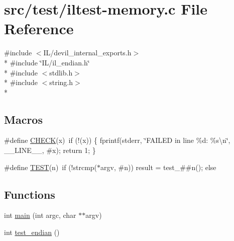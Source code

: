 \hypertarget{iltest-memory_8c}{\section{src/test/iltest-\/memory.c File Reference}
\label{iltest-memory_8c}
}
{\ttfamily \#include $<$I\-L/devil\-\_\-internal\-\_\-exports.\-h$>$}\\*
{\ttfamily \#include \char`\"{}I\-L/il\-\_\-endian.\-h\char`\"{}}\\*
{\ttfamily \#include $<$stdlib.\-h$>$}\\*
{\ttfamily \#include $<$string.\-h$>$}\\*
\subsection*{Macros}
\begin{DoxyCompactItemize}
\item 
\#define \hyperlink{iltest-memory_8c_a763ffd798508592c5092ac77daa5a659}{C\-H\-E\-C\-K}(x)~if (!(x)) \{ fprintf(stderr, \char`\"{}F\-A\-I\-L\-E\-D in line \%d\-: \%s\textbackslash{}n\char`\"{}, \-\_\-\-\_\-\-L\-I\-N\-E\-\_\-\-\_\-, \#x); return 1; \}
\item 
\#define \hyperlink{iltest-memory_8c_ac3d44964d4e029ca9274e12169c7fa61}{T\-E\-S\-T}(n)~if (!strcmp($\ast$argv, \#n)) result = test\-\_\-\#\#n(); else
\end{DoxyCompactItemize}
\subsection*{Functions}
\begin{DoxyCompactItemize}
\item 
int \hyperlink{iltest-memory_8c_a3c04138a5bfe5d72780bb7e82a18e627}{main} (int argc, char $\ast$$\ast$argv)
\item 
int \hyperlink{iltest-memory_8c_a81f02b34f6fd36ddc4d8d7b5449eca71}{test\-\_\-endian} ()
\end{DoxyCompactItemize}


